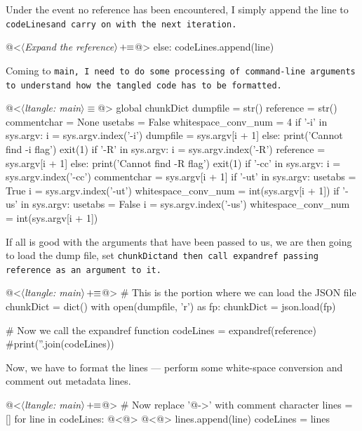 Under the event no reference has been encountered, I simply append the line to \tt codeLines\rm and carry on
with the next iteration.
\begin{oldcode}
@<$\langle$\textit{Expand the reference}$\rangle \thinspace +\!\!\equiv$@>
    else:
        codeLines.append(line)
\end{oldcode}

Coming to \tt main\rm, I need to do some processing of command-line arguments to understand how the tangled
code has to be formatted.

\begin{code}
@<$\langle$\textit{ltangle: main}$\rangle\equiv$@>
global chunkDict
dumpfile = str()
reference = str()
commentchar = None
usetabs = False
whitespace_conv_num = 4
if '-i' in sys.argv:
    i = sys.argv.index('-i')
    dumpfile = sys.argv[i + 1]
else:
    print('Cannot find -i flag')
    exit(1)
if '-R' in sys.argv:
    i = sys.argv.index('-R')
    reference = sys.argv[i + 1]
else:
    print('Cannot find -R flag')
    exit(1)
if '-cc' in sys.argv:
    i = sys.argv.index('-cc')
    commentchar = sys.argv[i + 1]
if '-ut' in sys.argv:
    usetabs = True
    i = sys.argv.index('-ut')
    whitespace_conv_num = int(sys.argv[i + 1])
if '-us' in sys.argv:
    usetabs = False
    i = sys.argv.index('-us')
    whitespace_conv_num = int(sys.argv[i + 1])

\end{code}

If all is good with the arguments that have been passed to us, we are then going to load the dump file, set
\tt chunkDict\rm and then call \tt expandref \rm passing reference as an argument to it.

\begin{oldcode}
@<$\langle$\textit{ltangle: main}$\rangle \thinspace +\!\!\equiv$@>
# This is the portion where we can load the JSON file
chunkDict = dict()
with open(dumpfile, 'r') as fp:
    chunkDict = json.load(fp)

# Now we call the expandref function
codeLines = expandref(reference)
#print(''.join(codeLines))

\end{oldcode}

Now, we have to format the lines --- perform some white-space conversion and comment out metadata lines.

\begin{oldcode}
@<$\langle$\textit{ltangle: main}$\rangle \thinspace +\!\!\equiv$@>
# Now replace '@->' with comment character
lines = []
for line in codeLines:
    @<@>
    @<@>
    lines.append(line)
codeLines = lines

\end{oldcode}

